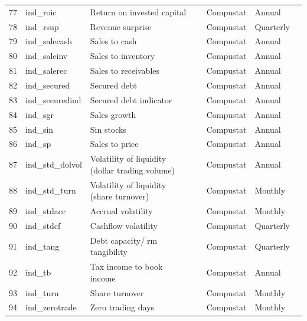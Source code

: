 \documentclass[a4paper, table]{article}
\begin{document}
\begin{landscape}
\begin{center}
\begin{longtable}{lllllll}
			77 & ind\_roic & Return on invested capital & 
				\cite{brown_productivity_2007} & Compustat & Annual \\
			78 & ind\_rsup & Revenue surprise & 
				\cite{kama_market_2009} & Compustat & Quarterly \\
			79 & ind\_salecash & Sales to cash & 
				\cite{ou_financial_1989} & Compustat & Annual \\
			80 & ind\_saleinv\footnotemark[\value{footnote}] & Sales to inventory & 
				\cite{ou_financial_1989} & Compustat & Annual \\
			81 & ind\_salerec & Sales to receivables & 
				\cite{ou_financial_1989} & Compustat & Annual \\
			82 & ind\_secured\footnotemark[\value{footnote}] & Secured debt & 
				\cite{valta_strategic_2016} & Compustat & Annual \\
			83 & ind\_securedind & Secured debt indicator & 
				\cite{valta_strategic_2016} & Compustat & Annual \\
			84 & ind\_sgr\footnotemark[\value{footnote}] & Sales growth & 
				\cite{barbee_jr_salesprice_1996} & Compustat & Annual \\
			85 & ind\_sin & Sin stocks & 
				\cite{hong_price_2009} & Compustat & Annual \\
			86 & ind\_sp & Sales to price & 
				\cite{barbee_jr_salesprice_1996} & Compustat & Annual \\
			87 & ind\_std\_dolvol & Volatility of liquidity (dollar trading volume) & 
				\cite{chordia_trading_2001} & Compustat & Annual \\
			88 & ind\_std\_turn & Volatility of liquidity (share turnover) & 
				\cite{chordia_trading_2001} & Compustat & Monthly \\
			89 & ind\_stdacc\footnotemark[\value{footnote}] & Accrual volatility & 
				\cite{bandyopadhyay_accrual_2010} & Compustat & Monthly \\
			90 & ind\_stdcf\footnotemark[\value{footnote}] & Cashflow volatility & 
				\cite{huang_cross_2009} & Compustat & Quarterly \\
			91 & ind\_tang & Debt capacity/rm tangibility & 
				\cite{almeida_financial_2007} & Compustat & Quarterly \\
			92 & ind\_tb\footnotemark[\value{footnote}] & Tax income to book income & 
				\cite{lev_market-based_1982} & Compustat & Annual \\
			93 & ind\_turn & Share turnover & 
				\cite{datar_liquidity_1998} & Compustat & Monthly \\
			94 & ind\_zerotrade & Zero trading days & 
				\cite{liu_liquidity-augmented_2006} & Compustat & Monthly \\ \hline	
		\end{longtable}
	\end{center}
\end{landscape}
\end{document}
